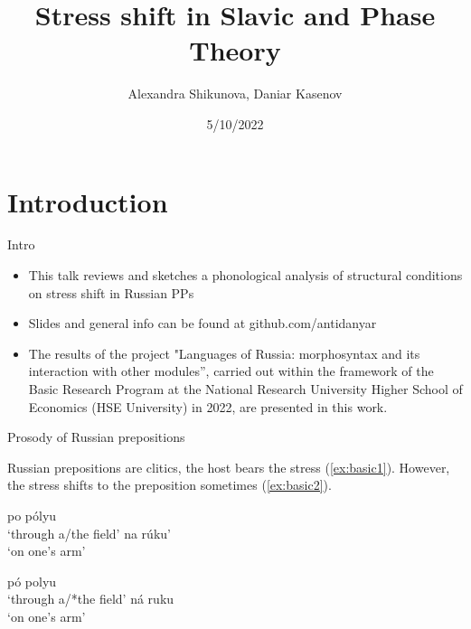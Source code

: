 \documentclass{beamer}
\title{Stress shift in Slavic and Phase Theory}
\date{5/10/2022 \\ }
\author{Alexandra Shikunova, Daniar Kasenov}
\begin{document}
\maketitle

	\section{Introduction}

	\begin{frame}{Intro}
	
		\begin{itemize}
			\item This talk reviews and sketches a phonological analysis of structural conditions on stress shift in Russian PPs 

			\item Slides and general info can be found at github.com/antidanyar

			\item {\small The results of the project "Languages of Russia: morphosyntax and its interaction with other modules”, carried out within the framework of the Basic Research Program at the National Research University Higher School of Economics (HSE University) in 2022, are presented in this work.}

		\end{itemize}

	\end{frame}

	\begin{frame}{Prosody of Russian prepositions}

		Russian prepositions are clitics, the host bears the stress (\ref{ex:basic1}). However, the stress shifts to the preposition sometimes (\ref{ex:basic2}).
		
		\begin{minipage}{.48\textwidth}
		\pex\label{ex:basic1}
				\a po pólyu\\
				`through a/the field'
				\a na rúku’\\
				`on one's arm'
		\xe
		\end{minipage}
		\hfill
		\begin{minipage}{.49\textwidth}
		\pex\label{ex:basic2}
				\a pó polyu\\
				`through a/*the field'
				\a ná ruku\\
				`on one's arm'
		\xe
		\end{minipage}

	\end{frame}
	
\end{document}
